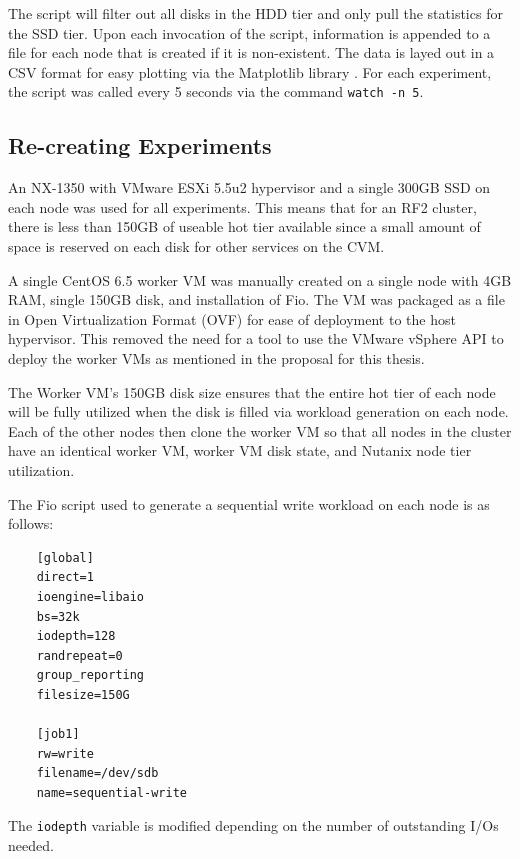 \documentclass[12pt]{article}
\begin{document}
  The script will filter out all disks in the HDD tier and only pull the
  statistics for the SSD tier. Upon each invocation of the script, information
  is appended to a file for each node that is created if it is non-existent.
  The data is layed out in a CSV format for easy plotting via the Matplotlib
  library \cite{matplotlib}. For each experiment, the script was called every 5
  seconds via the command \texttt{watch -n 5}.

  \subsection{Re-creating Experiments}

  An NX-1350 with VMware ESXi 5.5u2 hypervisor and a single 300GB SSD on each
  node was used for all experiments. This means that for an RF2
  cluster, there is less than 150GB of useable hot tier available since a small
  amount of space is reserved on each disk for other services on the CVM.

  A single CentOS 6.5 worker VM was manually created on a single node with 4GB
  RAM, single 150GB disk, and installation of Fio. The VM was packaged as a
  file in Open Virtualization Format (OVF) for ease of deployment to the host
  hypervisor. This removed the need for a tool to use the VMware vSphere API to
  deploy the worker VMs as mentioned in the proposal for this thesis.

  The Worker VM's 150GB disk size ensures that the entire hot tier of each node
  will be fully utilized when the disk is filled via workload generation on
  each node. Each of the other nodes then clone the worker VM so that all nodes
  in the cluster have an identical worker VM, worker VM disk state, and Nutanix
  node tier utilization.

  The Fio script used to generate a sequential write workload on each node is
  as follows:
  
  \singlespace
  \begin{tcolorbox}
  \begin{verbatim}
    [global]
    direct=1
    ioengine=libaio
    bs=32k
    iodepth=128
    randrepeat=0
    group_reporting
    filesize=150G

    [job1]
    rw=write
    filename=/dev/sdb
    name=sequential-write
  \end{verbatim}
  \end{tcolorbox}
  \doublespace

  The \texttt{iodepth} variable is modified depending on the number of
  outstanding I/Os needed.
\end{document}
